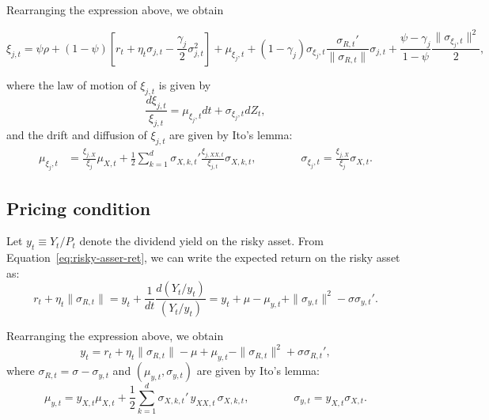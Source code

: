 Rearranging the expression above, we obtain
\begin{small}
\begin{equation}
    \xi_{j,t} = \psi \rho + (1-\psi) \left[ r_t + \eta_t \sigma_{j,t} - \frac{\gamma_j}{2} \sigma_{j,t}^2 \right] + \mu_{\xi_j,t} + (1-\gamma_j)  \sigma_{\xi_j,t} \frac{\sigma_{R,t}'}{\|\sigma_{R,t}\|} \sigma_{j,t} + \frac{\psi - \gamma_j}{1-\psi} \frac{\|\sigma_{\xi_j,t} \|^2}{2},
\end{equation}
\end{small}
where the law of motion of $\xi_{j,t}$ is given by
\begin{equation}
    \frac{d \xi_{j,t}}{\xi_{j,t}} = \mu_{\xi_j,t} dt + \sigma_{\xi_j,t} d Z_t,
\end{equation}
and the drift and diffusion of $\xi_{j,t}$ are given by Ito's lemma:
\begin{align}
    \mu_{\xi_j,t} &= \frac{\xi_{j,X}}{\xi_j} \mu_{X,t} + \frac{1}{2} \sum_{k=1}^d \sigma_{X,k,t}' \frac{\xi_{j,XX,t}}{\xi_{j,t}} \sigma_{X,k,t}, \qquad \qquad 
    \sigma_{\xi_j,t} = \frac{\xi_{j,X}}{\xi_j} \sigma_{X,t}.
\end{align}


\subsection{Pricing condition} 

Let $y_t \equiv Y_t/P_t$ denote the dividend yield on the risky asset. From Equation~\eqref{eq:risky-asser-ret}, we can write the expected return on the risky asset as:
\begin{equation}
    r_t + \eta_t \| \sigma_{R,t}\| = y_t + \frac{1}{dt} \frac{d(Y_t/y_t)}{(Y_t/y_t)} = y_t + \mu - \mu_{y,t} + \|\sigma_{y,t}\|^2 - \sigma \sigma_{y,t}'.
\end{equation}

Rearranging the expression above, we obtain
\begin{equation}\label{app:pricing_cond}
    y_t = r_t + \eta_t \|\sigma_{R,t}\| -\mu + \mu_{y,t} - \|\sigma_{R,t}\|^2+ \sigma \sigma_{R,t}',
\end{equation}
where $\sigma_{R,t} = \sigma - \sigma_{y,t}$ and $(\mu_{y,t}, \sigma_{y,t})$ are given by Ito's lemma:
\begin{equation}
    \mu_{y,t} = y_{X,t} \mu_{X,t} + \frac{1}{2}\sum_{k=1}^d \sigma_{X,k,t}'\,y_{XX,t}\,\sigma_{X,k,t}, \qquad \qquad 
    \sigma_{y,t} = y_{X,t} \sigma_{X,t}.
\end{equation}


